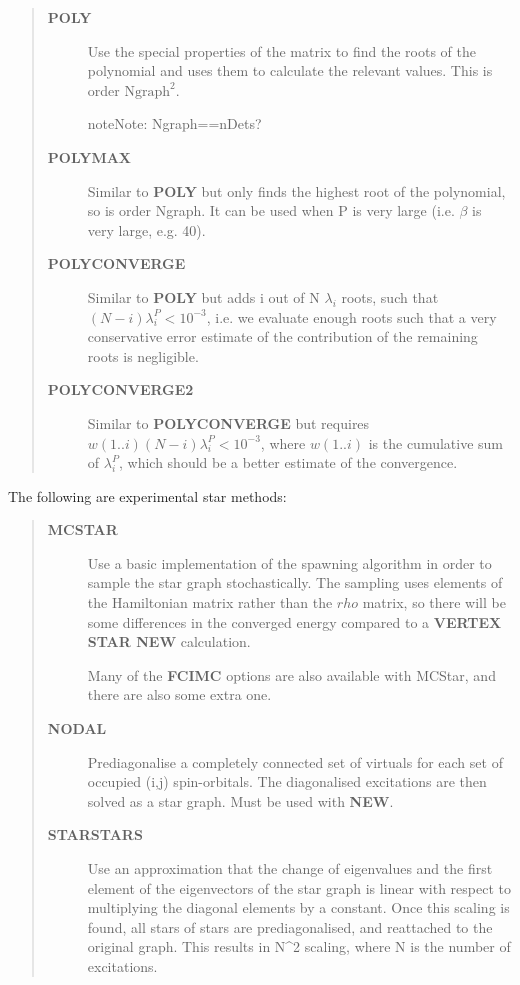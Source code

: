 \documentclass[openany,a4paper,10pt,english]{manual}
\begin{document}
\begin{description}
\begin{quote}
\begin{description}
\item[\textbf{POLY}] \leavevmode
Use the special properties of the matrix to find the roots of
the polynomial and uses them to calculate the relevant values.
This is order $\text{Ngraph}^2$.

\begin{notice}{note}{Note:}
Ngraph==nDets?
\end{notice}

\item[\textbf{POLYMAX}] \leavevmode
Similar to \textbf{POLY} but only finds the highest root of the polynomial, so
is order Ngraph.  It can be used when P is very large (i.e. $\beta$
is very large, e.g. 40).

\item[\textbf{POLYCONVERGE}] \leavevmode
Similar to \textbf{POLY} but adds i out of N $\lambda_i$
roots, such that $(N-i) \lambda_i^P < 10^{-3}$, i.e. we
evaluate enough roots such that a very conservative error
estimate of the contribution of the remaining roots is
negligible.

\item[\textbf{POLYCONVERGE2}] \leavevmode
Similar to \textbf{POLYCONVERGE} but requires
$w(1..i) (N-i) \lambda_i^P < 10^{-3}$, where
$w(1..i)$ is the cumulative sum of $\lambda_i^P$,
which should be a better estimate of the convergence.

\end{description}
\end{quote}

The following are experimental star methods:
\begin{quote}
\begin{description}
\item[\textbf{MCSTAR}] \leavevmode
Use a basic implementation of the spawning algorithm in
order to sample the star graph stochastically. The sampling uses
elements of the Hamiltonian matrix rather than the $rho$ matrix,
so there will be some differences in the converged energy
compared to a \textbf{VERTEX STAR NEW} calculation.

Many of the \textbf{FCIMC} options are also available with MCStar,
and there are also some extra one.

\item[\textbf{NODAL}] \leavevmode
Prediagonalise a completely connected set of virtuals for each
set of occupied (i,j) spin-orbitals. The diagonalised
excitations are then solved as a star graph. Must be used
with \textbf{NEW}.

\item[\textbf{STARSTARS}] \leavevmode
Use an approximation that the change of eigenvalues and the
first element of the eigenvectors of the star graph is linear with
respect to multiplying the diagonal elements by a constant. Once
this scaling is found, all stars of stars are prediagonalised,
and reattached to the original graph. This results in N\textasciicircum{}2 scaling,
where N is the number of excitations.


\end{description}
\end{quote}
\end{description}
\end{document}
